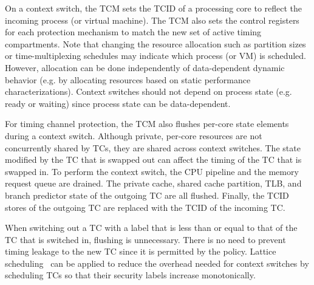 On a context switch, the TCM sets the TCID of a processing core to reflect
the incoming process (or virtual machine). The TCM also sets the control
registers for each protection mechanism to match the new set of active
timing compartments. Note that changing the resource allocation such as
partition sizes or time-multiplexing schedules may indicate
which process (or VM) is scheduled. However, allocation can be done
independently of data-dependent dynamic behavior (e.g. by allocating resources
based on static performance characterizations). Context switches should not 
depend on process state (e.g. ready or waiting) since process state can be 
data-dependent.

For timing channel protection, the TCM also flushes per-core state elements
during a context switch.
Although private, per-core resources are not concurrently shared by TCs, they 
are shared across context switches. The state modified by the TC that is 
swapped out can affect the timing of the TC that is swapped in.
To perform the context switch, the CPU pipeline and the memory request queue 
are drained. 
The private cache, shared cache 
partition, TLB, and branch predictor state of the outgoing TC are all flushed.  
Finally, the TCID stores of the outgoing TC are replaced with the TCID of the 
incoming TC. 

When switching out a TC with a label that is less than or equal to that of the 
TC that is switched in, flushing is unnecessary. There is no need to prevent 
timing leakage to the new TC since it is permitted by the policy.
Lattice scheduling~\cite{lattice-scheduling} can be applied to reduce the
overhead needed for context switches by scheduling TCs so that their security
labels increase monotonically. 




